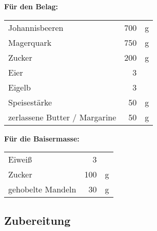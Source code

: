 \textbf{Für den Belag:\\}
\begin{tabular}{lrl}
    Johannisbeeren                & 700 & g \\
    Magerquark                    & 750 & g \\
    Zucker                        & 200 & g \\
    Eier                          &   3 &   \\
    Eigelb                        &   3 &   \\
    Speisestärke                  &  50 & g \\
    zerlassene Butter / Margarine &  50 & g
\end{tabular} 

\textbf{Für die Baisermasse:\\}
\begin{tabular}{lrl}
    Eiweiß            &   3 &   \\
    Zucker            & 100 & g \\
    gehobelte Mandeln &  30 & g
\end{tabular} 


\subsection*{Zubereitung}

